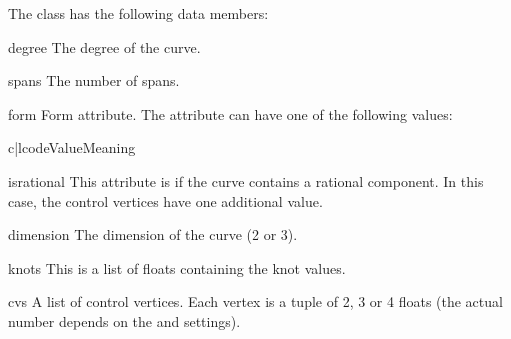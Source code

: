 The class has the following data members:

\begin{memberdesc}{degree}
The degree of the curve.
\end{memberdesc}

\begin{memberdesc}{spans}
The number of spans.
\end{memberdesc}

\begin{memberdesc}{form}
Form attribute. The attribute can have one of the following values:

\begin{tableii}{c|l}{code}{Value}{Meaning}
\end{tableii}
\end{memberdesc}

\begin{memberdesc}{isrational}
This attribute is  if the curve contains a rational component.
In this case, the control vertices have one additional value.
\end{memberdesc}

\begin{memberdesc}{dimension}
The dimension of the curve (2 or 3).
\end{memberdesc}

\begin{memberdesc}{knots}
This is a list of floats containing the knot values.
\end{memberdesc}

\begin{memberdesc}{cvs}
A list of control vertices. Each vertex is a tuple of 2, 3 or 4 floats
(the actual number depends on the  and 
settings).
\end{memberdesc}
